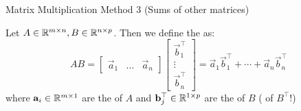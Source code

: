 \documentclass[xcoler=dvipsnames, aspectratio=169]{beamer}
\begin{document}
    \begin{frame}{Matrix Multiplication Method 3 (Sums of other matrices)}
        \small
        \begin{tcolorbox}
            Let $A\in\mathbb{R}^{m\times n},B\in\mathbb{R}^{n\times p}$. Then we define the 
            as: 
            \[
                AB = \begin{bmatrix} \vec{a}_1 & \dots & \vec{a}_n\end{bmatrix} \begin{bmatrix}
                    \vec{b}_1^\top\\\vdots\\\vec{b}_n^\top
            \end{bmatrix} = \vec{a}_1\vec{b}_1^\top + \cdots + \vec{a}_n\vec{b}_n^\top
            \]
            where $\mathbf{a}_i\in\mathbb{R}^{m\times 1}$ are the  of $A$ and 
            $\mathbf{b}_j^\top\in\mathbb{R}^{1\times p}$ are the  of $B$ ( of $B^\top$!)
        \end{tcolorbox}\pause
    \end{frame}
\end{document}
